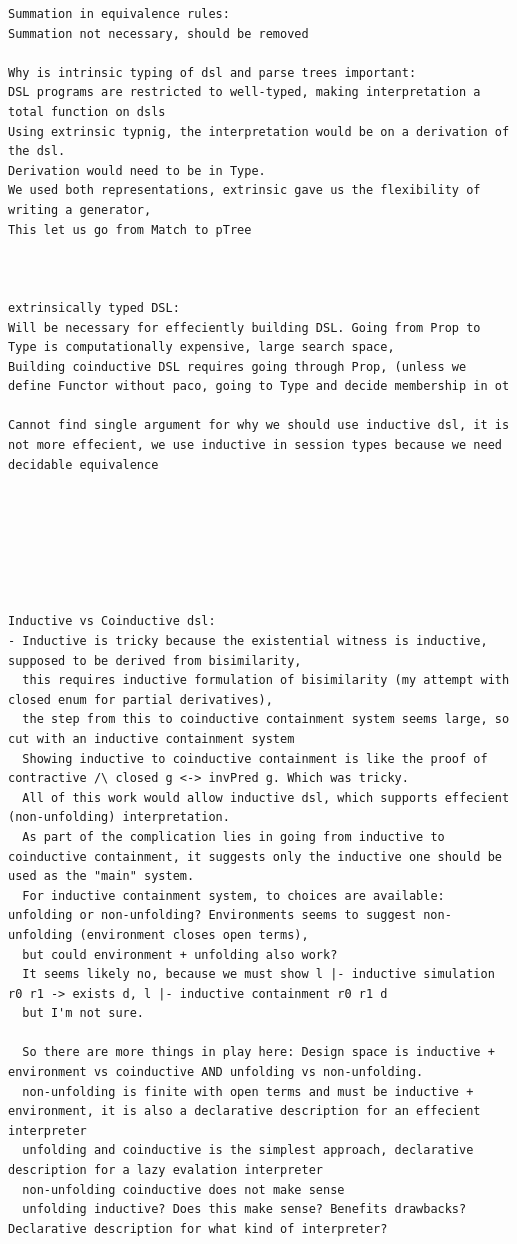 \documentclass[a4paper,UKenglish,cleveref, autoref, thm-restate]{lipics-v2021}
\begin{document}
\begin{verbatim}
Summation in equivalence rules:
Summation not necessary, should be removed

Why is intrinsic typing of dsl and parse trees important:
DSL programs are restricted to well-typed, making interpretation a total function on dsls
Using extrinsic typnig, the interpretation would be on a derivation of the dsl.
Derivation would need to be in Type.
We used both representations, extrinsic gave us the flexibility of writing a generator,
This let us go from Match to pTree



extrinsically typed DSL:
Will be necessary for effeciently building DSL. Going from Prop to Type is computationally expensive, large search space,
Building coinductive DSL requires going through Prop, (unless we define Functor without paco, going to Type and decide membership in ot

Cannot find single argument for why we should use inductive dsl, it is not more effecient, we use inductive in session types because we need decidable equivalence







Inductive vs Coinductive dsl:
- Inductive is tricky because the existential witness is inductive, supposed to be derived from bisimilarity,
  this requires inductive formulation of bisimilarity (my attempt with closed enum for partial derivatives),
  the step from this to coinductive containment system seems large, so cut with an inductive containment system
  Showing inductive to coinductive containment is like the proof of contractive /\ closed g <-> invPred g. Which was tricky.
  All of this work would allow inductive dsl, which supports effecient (non-unfolding) interpretation.
  As part of the complication lies in going from inductive to coinductive containment, it suggests only the inductive one should be used as the "main" system.
  For inductive containment system, to choices are available: unfolding or non-unfolding? Environments seems to suggest non-unfolding (environment closes open terms),
  but could environment + unfolding also work? 
  It seems likely no, because we must show l |- inductive simulation r0 r1 -> exists d, l |- inductive containment r0 r1 d
  but I'm not sure.

  So there are more things in play here: Design space is inductive + environment vs coinductive AND unfolding vs non-unfolding.
  non-unfolding is finite with open terms and must be inductive + environment, it is also a declarative description for an effecient interpreter 
  unfolding and coinductive is the simplest approach, declarative description for a lazy evalation interpreter
  non-unfolding coinductive does not make sense
  unfolding inductive? Does this make sense? Benefits drawbacks? Declarative description for what kind of interpreter?



\end{verbatim}
\end{document}
